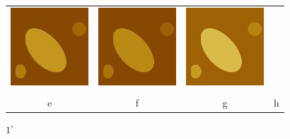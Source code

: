 \documentclass{procDDs}
\begin{document}
\begin{figure}[h!]
\begin{tabular}{cccc}
		\includegraphics[width=0.2\linewidth]{img/5/7.jpg}&
		\includegraphics[width=0.2\linewidth]{img/5/8.jpg}&
		\includegraphics[width=0.2\linewidth]{img/5/9.jpg}\\
		\\
		e & f & g & h		
	\end{tabular}
	\caption{$1^\circ$}
	\label{ris:desc1}
\end{figure}
\end{document}

